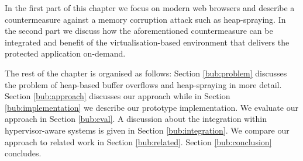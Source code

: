 In the first part of this chapter we focus on modern web browsers and describe a countermeasure against a memory corruption attack such as heap-spraying. In the second part we discuss how the aforementioned countermeasure can be integrated and benefit of the virtualisation-based environment that delivers the protected application on-demand.

The rest of the chapter is organised as follows: Section \ref{bub:problem} discusses the problem of heap-based buffer overflows and heap-spraying in more detail. Section \ref{bub:approach} discusses our approach while in Section \ref{bub:implementation} we describe our prototype implementation. We evaluate our approach in Section \ref{bub:eval}. 
A discussion about the integration within hypervisor-aware systems is given in Section \ref{bub:integration}. We compare our approach to related work in Section \ref{bub:related}. Section \ref{bub:conclusion} concludes.
